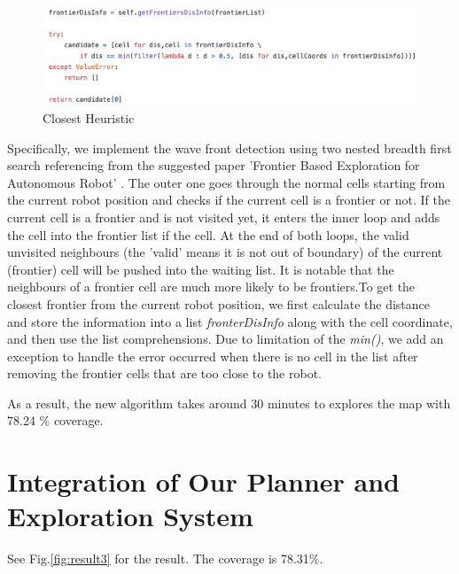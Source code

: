 \documentclass{article}
\begin{document}
\begin{figure}[ht]
\centering
\includegraphics[scale=0.5]{graphs/part2/2-3/closest.png}
\caption{Closest Heuristic}
\label{fig:closestHeuristic}
\end{figure}

Specifically, we implement the wave front detection using two nested breadth first search referencing from the suggested paper 'Frontier Based Exploration for Autonomous Robot' \cite{WFD}. The outer one goes through the normal cells starting from the current robot position and checks if the current cell is a frontier or not. If the current cell is a frontier and is not visited yet, it enters the inner loop and adds the cell into the frontier list if the cell. At the end of both loops, the valid unvisited neighbours (the 'valid' means it is not out of boundary) of the current (frontier) cell will be pushed into the waiting list. It is notable that the neighbours of a frontier cell are much more likely to be frontiers.To get the closest frontier from the current robot position, we first calculate the distance and store the information into a list \textit{fronterDisInfo} along with the cell coordinate, and then use the list comprehensions. Due to limitation of the \textit{min()}, we add an exception to handle the error occurred when there is no cell in the list after removing the frontier cells that are too close to the robot. 

As a result, the new algorithm takes around 30 minutes to explores the map with 78.24 \% coverage. 

\pagebreak
\section{Integration of Our Planner and Exploration System}

See Fig.\ref{fig:result3} for the result. The coverage is  78.31\%.
\end{document}
